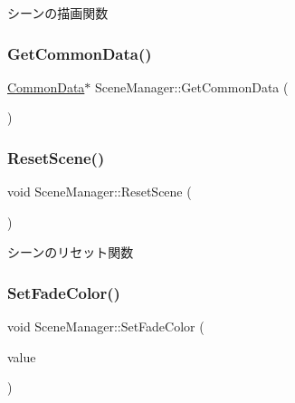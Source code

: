 シーンの描画関数 

\mbox{\label{class_scene_manager_ad2fb33bb5ff645427353d7085c8be8d4}} 
\subsubsection{\texorpdfstring{Get\+Common\+Data()}{GetCommonData()}}
{\footnotesize\ttfamily \mbox{\hyperlink{class_scene_manager_1_1_common_data}{Common\+Data}}$\ast$ Scene\+Manager\+::\+Get\+Common\+Data (\begin{DoxyParamCaption}{ }\end{DoxyParamCaption})\hspace{0.3cm}{\ttfamily [inline]}}

\mbox{\label{class_scene_manager_a1759161a38025ec8212dc98439fd7335}} 
\subsubsection{\texorpdfstring{Reset\+Scene()}{ResetScene()}}
{\footnotesize\ttfamily void Scene\+Manager\+::\+Reset\+Scene (\begin{DoxyParamCaption}{ }\end{DoxyParamCaption})}



シーンのリセット関数 

\mbox{\label{class_scene_manager_a4dc85343025336320c32bb66961bda4a}} 
\subsubsection{\texorpdfstring{Set\+Fade\+Color()}{SetFadeColor()}}
{\footnotesize\ttfamily void Scene\+Manager\+::\+Set\+Fade\+Color (\begin{DoxyParamCaption}\item[{\mbox{\hyperlink{_vector3_d_8h_a680c30c4a07d86fe763c7e01169cd6cc}{X\+Color4}}}]{value }\end{DoxyParamCaption})\hspace{0.3cm}{\ttfamily [inline]}}

